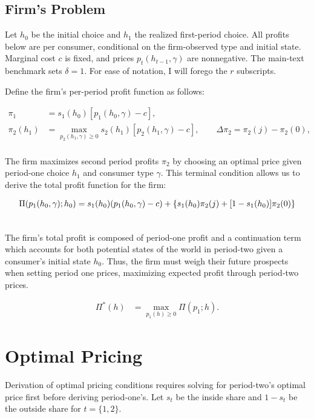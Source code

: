 \documentclass[12pt]{article}
\theoremstyle{definition}
\theoremstyle{remark}
\begin{document}
\subsection{Firm's Problem}
\label{subsec:firm-problem}
Let $h_0$ be the initial choice and $h_1$ the realized first-period choice.
All profits below are per consumer, conditional on the firm-observed type and initial state.
Marginal cost $c$ is fixed, and prices $p_{t}(h_{t-1}, \gamma)$ are nonnegative. The main-text benchmark sets $\delta=1$. For ease of notation, I will forego the $r$ subscripts. 

Define the firm's per-period profit function as follows:

\begin{align}
  \pi_1 &= s_1(h_0)[p_1(h_0, \gamma)-c], \\
 \pi_2(h_1)&=\max_{p_2(h_1, \gamma)\geq 0}s_2(h_1)[p_2(h_1,\gamma)-c],
 \qquad \Delta \pi_2=\pi_2(j)-\pi_2(0),\\
\end{align}

The firm maximizes second period profits $\pi_2$ by choosing an optimal price given period-one choice $h_1$ and consumer type $\gamma$. This terminal condition allows us to derive the total profit function for the firm:

\begin{align}
\Pi(p_1(h_0, \gamma);h_0)&=s_1(h_0)(p_1(h_0,\gamma)-c)
 +\{s_1(h_0)\pi_2(j)+[1-s_1(h_0)]\pi_2(0)\}\notag\\
 \label{eq:supply-profit}\\
\end{align}

The firm's total profit is composed of period-one profit and a continuation term which accounts for both potential states of the world in period-two given a consumer's initial state $h_0$. Thus, the firm must weigh their future prospects when setting period one prices, maximizing expected profit through period-two prices. 

\begin{align}
 \Pi^*(h)&=\max_{p_1(h)\geq 0}\Pi(p_1;h).
\end{align}

\section{Optimal Pricing}
\label{sec:optimal-pricing}

Derivation of optimal pricing conditions requires solving for period-two's optimal price first before deriving period-one's. Let $s_t$ be the inside share and $1-s_t$ be the outside share for $t=\{1,2\}$.
\end{document}
